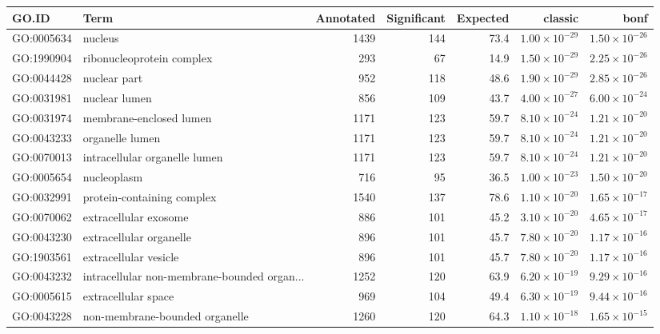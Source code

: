 \begin{table}[ht]
\centering
\begin{adjustbox}{max width=\textwidth}
\begin{tabular}{llrrrrr}
  \hline
GO.ID & Term & Annotated & Significant & Expected & classic & bonf \\ 
  \hline
GO:0005634 & nucleus & 1439 & 144 & 73.4 & $1.00 \times 10^{-29}$ & $1.50 \times 10^{-26}$ \\ 
  GO:1990904 & ribonucleoprotein complex & 293 & 67 & 14.9 & $1.50 \times 10^{-29}$ & $2.25 \times 10^{-26}$ \\ 
  GO:0044428 & nuclear part & 952 & 118 & 48.6 & $1.90 \times 10^{-29}$ & $2.85 \times 10^{-26}$ \\ 
  GO:0031981 & nuclear lumen & 856 & 109 & 43.7 & $4.00 \times 10^{-27}$ & $6.00 \times 10^{-24}$ \\ 
  GO:0031974 & membrane-enclosed lumen & 1171 & 123 & 59.7 & $8.10 \times 10^{-24}$ & $1.21 \times 10^{-20}$ \\ 
  GO:0043233 & organelle lumen & 1171 & 123 & 59.7 & $8.10 \times 10^{-24}$ & $1.21 \times 10^{-20}$ \\ 
  GO:0070013 & intracellular organelle lumen & 1171 & 123 & 59.7 & $8.10 \times 10^{-24}$ & $1.21 \times 10^{-20}$ \\ 
  GO:0005654 & nucleoplasm & 716 & 95 & 36.5 & $1.00 \times 10^{-23}$ & $1.50 \times 10^{-20}$ \\ 
  GO:0032991 & protein-containing complex & 1540 & 137 & 78.6 & $1.10 \times 10^{-20}$ & $1.65 \times 10^{-17}$ \\ 
  GO:0070062 & extracellular exosome & 886 & 101 & 45.2 & $3.10 \times 10^{-20}$ & $4.65 \times 10^{-17}$ \\ 
  GO:0043230 & extracellular organelle & 896 & 101 & 45.7 & $7.80 \times 10^{-20}$ & $1.17 \times 10^{-16}$ \\ 
  GO:1903561 & extracellular vesicle & 896 & 101 & 45.7 & $7.80 \times 10^{-20}$ & $1.17 \times 10^{-16}$ \\ 
  GO:0043232 & intracellular non-membrane-bounded organ... & 1252 & 120 & 63.9 & $6.20 \times 10^{-19}$ & $9.29 \times 10^{-16}$ \\ 
  GO:0005615 & extracellular space & 969 & 104 & 49.4 & $6.30 \times 10^{-19}$ & $9.44 \times 10^{-16}$ \\ 
  GO:0043228 & non-membrane-bounded organelle & 1260 & 120 & 64.3 & $1.10 \times 10^{-18}$ & $1.65 \times 10^{-15}$ \\ 

\end{tabular}
\end{adjustbox}
\end{table}
